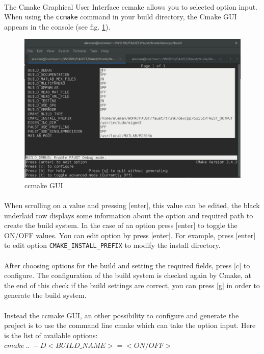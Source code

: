 \paragraph{}The Cmake Graphical User Interface ccmake allows you to selected option input. When using the \texttt{ccmake} command in your build directory, the Cmake GUI appears in the console (see fig. \ref{fig:ccmake}).

\begin{figure}[!h] %
\centering
\includegraphics[scale=0.5]{images/ccmake.jpg}
\caption{ccmake GUI}
\label{fig:ccmake}
\end{figure}


\paragraph{}When scrolling on a value and pressing [enter], this value can be edited, the black underlaid row displays some information about the option and required path to create the build system. In the case of an option press [enter] to toggle the ON/OFF values. You can edit option by press [enter]. For example, press [enter] to edit option \texttt{CMAKE\_INSTALL\_PREFIX} to modify the install directory. 
\paragraph{}After choosing options for the build and setting the required fields, press [c] to configure. The configuration of the build system is checked again by Cmake, at the end of this check if the build settings are correct, you can press [g] in order to generate the build system.

\paragraph{} Instead the ccmake GUI, an other possibility to configure and generate the project is to use the command line cmake which can take the option input. Here is the list of available options: 
\texttt{$cmake\ ..\ -D<BUILD\_NAME>=<ON/OFF>$}

